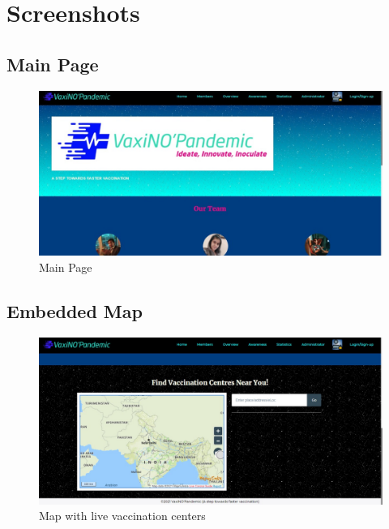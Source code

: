 \documentclass{article}
\begin{document}
\section{Screenshots}
    \subsection{Main Page}
        \begin{figure}[hbt]
            \centering
            \includegraphics[scale=0.3]{mainpage.jpeg}
            \caption{Main Page}
            \label{fig:mainpage}
        \end{figure}
    \newpage
    \subsection{Embedded Map}
        \begin{figure}[hbt]
            \centering
            \includegraphics[scale=0.3]{maparea.jpeg}
            \caption{Map with live vaccination centers}
            \label{fig:maparea}
        \end{figure}
\end{document}
